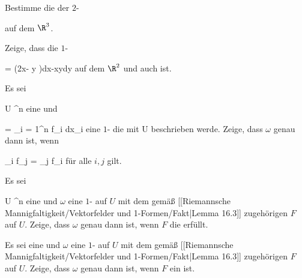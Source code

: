 {}
{

Bestimme die
 der
$2$-

 {  }
 auf dem $\R^3$.

}
{} {}

{}
{

Zeige, dass die
$1$-

\mavergleichskette
{\vergleichskette
{ \omega
}
{ = }{ (2x- \sin  y )dx-x\cos  ydy
}
{  }{
}
{    }{
}
{   }{
}
}
{}{}{}
auf dem $\R^2$
und auch
ist.

}
{} {}

{}
{

Es sei

\mavergleichskette
{\vergleichskette
{ U
}
{ \subseteq }{ \R^n
}
{  }{
}
{    }{
}
{   }{
}
}
{}{}{}
eine
und

\mavergleichskette
{\vergleichskette
{ \omega
}
{ = }{ \sum_{i = 1}^n f_i dx_i
}
{  }{
}
{    }{
}
{   }{
}
}
{}{}{}
eine
$1$-
die mit
 { U } { \R
} {}
beschrieben werde. Zeige, dass $\omega$ genau dann
ist, wenn

\mavergleichskettedisp
{\vergleichskette
{ \partial_i f_j
}
{ =} { \partial_j f_i
}
{ } {
}
{ } {
}
{ } {
}
}
{}{}{}
für alle $i,j$  gilt.

}
{} {}

{}
{

Es sei

\mavergleichskette
{\vergleichskette
{ U
}
{ \subseteq }{ \R^n
}
{  }{
}
{    }{
}
{   }{
}
}
{}{}{}
eine
und $\omega$ eine
$1$-
auf $U$ mit dem gemäß
[[Riemannsche Mannigfaltigkeit/Vektorfelder und 1-Formen/Fakt|Lemma 16.3]]
zugehörigen
$F$ auf $U$. Zeige, dass $\omega$ genau dann
ist, wenn $F$ die
erfüllt.

}
{} {}

{}
{

Es sei
 eine
und $\omega$ eine
$1$-
auf $U$ mit dem gemäß
[[Riemannsche Mannigfaltigkeit/Vektorfelder und 1-Formen/Fakt|Lemma 16.3]]
zugehörigen
$F$ auf $U$. Zeige, dass $\omega$ genau dann
ist, wenn $F$ ein
ist.

}
{} {}

